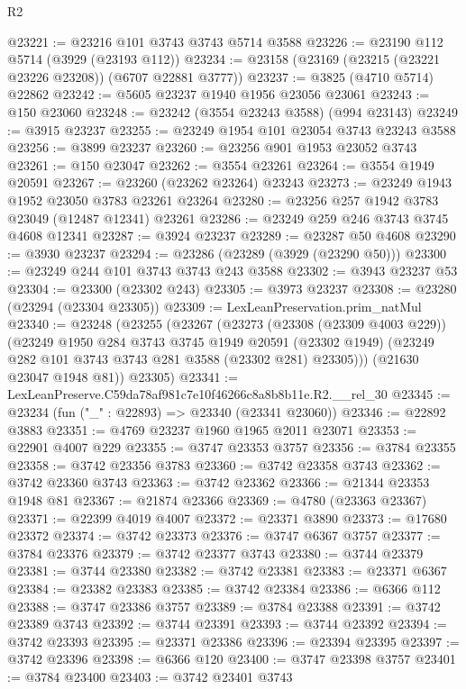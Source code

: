 \begin{lexlean}{R2}
\begin{coremodule}
@23221 := @23216 @101 @3743 @3743 @5714 @3588
@23226 := @23190 @112 @5714 (@3929 (@23193 @112))
@23234 := @23158 (@23169 (@23215 (@23221 @23226 @23208)) (@6707 @22881 @3777))
@23237 := @3825 (@4710 @5714) @22862
@23242 := @5605 @23237 @1940 @1956 @23056 @23061
@23243 := @150 @23060
@23248 := @23242 (@3554 @23243 @3588) (@994 @23143)
@23249 := @3915 @23237
@23255 := @23249 @1954 @101 @23054 @3743 @23243 @3588
@23256 := @3899 @23237
@23260 := @23256 @901 @1953 @23052 @3743
@23261 := @150 @23047
@23262 := @3554 @23261
@23264 := @3554 @1949 @20591
@23267 := @23260 (@23262 @23264) @23243
@23273 := @23249 @1943 @1952 @23050 @3783 @23261 @23264
@23280 := @23256 @257 @1942 @3783 @23049 (@12487 @12341) @23261
@23286 := @23249 @259 @246 @3743 @3745 @4608 @12341
@23287 := @3924 @23237
@23289 := @23287 @50 @4608
@23290 := @3930 @23237
@23294 := @23286 (@23289 (@3929 (@23290 @50)))
@23300 := @23249 @244 @101 @3743 @3743 @243 @3588
@23302 := @3943 @23237 @53
@23304 := @23300 (@23302 @243)
@23305 := @3973 @23237
@23308 := @23280 (@23294 (@23304 @23305))
@23309 := LexLeanPreservation.prim_natMul
@23340 := @23248
    (@23255
      (@23267
        (@23273
          (@23308 (@23309 @4003 @229))
          (@23249
            @1950
            @284
            @3743
            @3745
            @1949
            @20591
            (@23302 @1949)
            (@23249 @282 @101 @3743 @3743 @281 @3588 (@23302 @281) @23305)))
        (@21630 @23047 @1948 @81))
      @23305)
@23341 := LexLeanPreserve.C59da78af981c7e10f46266c8a8b8b11e.R2.__rel_30
@23345 := @23234 (fun ("_" : @22893) => @23340 (@23341 @23060))
@23346 := @22892 @3883
@23351 := @4769 @23237 @1960 @1965 @2011 @23071
@23353 := @22901 @4007 @229
@23355 := @3747 @23353 @3757
@23356 := @3784 @23355
@23358 := @3742 @23356 @3783
@23360 := @3742 @23358 @3743
@23362 := @3742 @23360 @3743
@23363 := @3742 @23362
@23366 := @21344 @23353 @1948 @81
@23367 := @21874 @23366
@23369 := @4780 (@23363 @23367)
@23371 := @22399 @4019 @4007
@23372 := @23371 @3890
@23373 := @17680 @23372
@23374 := @3742 @23373
@23376 := @3747 @6367 @3757
@23377 := @3784 @23376
@23379 := @3742 @23377 @3743
@23380 := @3744 @23379
@23381 := @3744 @23380
@23382 := @3742 @23381
@23383 := @23371 @6367
@23384 := @23382 @23383
@23385 := @3742 @23384
@23386 := @6366 @112
@23388 := @3747 @23386 @3757
@23389 := @3784 @23388
@23391 := @3742 @23389 @3743
@23392 := @3744 @23391
@23393 := @3744 @23392
@23394 := @3742 @23393
@23395 := @23371 @23386
@23396 := @23394 @23395
@23397 := @3742 @23396
@23398 := @6366 @120
@23400 := @3747 @23398 @3757
@23401 := @3784 @23400
@23403 := @3742 @23401 @3743

\end{coremodule}
\end{lexlean}

